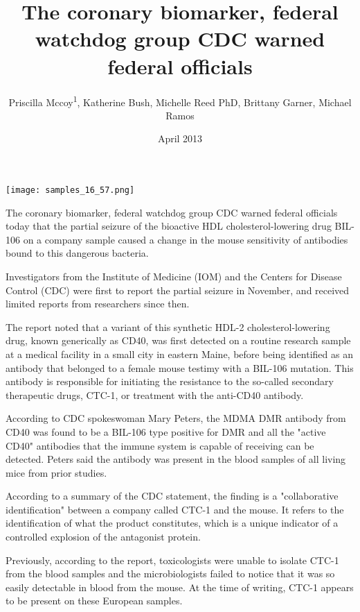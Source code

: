 \documentclass{article}
\title{The coronary biomarker, federal watchdog group CDC warned federal officials}
\author{Priscilla Mccoy\textsuperscript{1},  Katherine Bush,  Michelle Reed PhD,  Brittany Garner,  Michael Ramos}
\affil{\textsuperscript{1}Rutgers, The State University of New Jersey}
\date{April 2013}
\begin{document}
\maketitle

\begin{center}
\begin{minipage}{0.75\linewidth}
\texttt{[image: samples\_16\_57.png]}
\end{minipage}
\end{center}

The coronary biomarker, federal watchdog group CDC warned federal officials today that the partial seizure of the bioactive HDL cholesterol-lowering drug BIL-106 on a company sample caused a change in the mouse sensitivity of antibodies bound to this dangerous bacteria.

Investigators from the Institute of Medicine (IOM) and the Centers for Disease Control (CDC) were first to report the partial seizure in November, and received limited reports from researchers since then.

The report noted that a variant of this synthetic HDL-2 cholesterol-lowering drug, known generically as CD40, was first detected on a routine research sample at a medical facility in a small city in eastern Maine, before being identified as an antibody that belonged to a female mouse testimy with a BIL-106 mutation. This antibody is responsible for initiating the resistance to the so-called secondary therapeutic drugs, CTC-1, or treatment with the anti-CD40 antibody.

According to CDC spokeswoman Mary Peters, the MDMA DMR antibody from CD40 was found to be a BIL-106 type positive for DMR and all the "active CD40" antibodies that the immune system is capable of receiving can be detected. Peters said the antibody was present in the blood samples of all living mice from prior studies.

According to a summary of the CDC statement, the finding is a "collaborative identification" between a company called CTC-1 and the mouse. It refers to the identification of what the product constitutes, which is a unique indicator of a controlled explosion of the antagonist protein.

Previously, according to the report, toxicologists were unable to isolate CTC-1 from the blood samples and the microbiologists failed to notice that it was so easily detectable in blood from the mouse. At the time of writing, CTC-1 appears to be present on these European samples.
\end{document}

